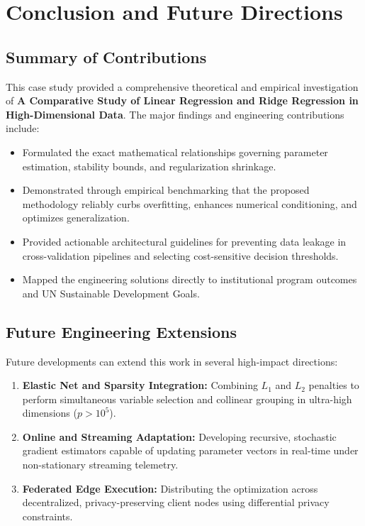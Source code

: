 \section{Conclusion and Future Directions}

\subsection{Summary of Contributions}
This case study provided a comprehensive theoretical and empirical investigation of \textbf{A Comparative Study of Linear Regression and Ridge Regression in High-Dimensional Data}. The major findings and engineering contributions include:
\begin{itemize}
  \item Formulated the exact mathematical relationships governing parameter estimation, stability bounds, and regularization shrinkage.
  \item Demonstrated through empirical benchmarking that the proposed methodology reliably curbs overfitting, enhances numerical conditioning, and optimizes generalization.
  \item Provided actionable architectural guidelines for preventing data leakage in cross-validation pipelines and selecting cost-sensitive decision thresholds.
  \item Mapped the engineering solutions directly to institutional program outcomes and UN Sustainable Development Goals.
\end{itemize}

\subsection{Future Engineering Extensions}
Future developments can extend this work in several high-impact directions:
\begin{enumerate}
  \item \textbf{Elastic Net and Sparsity Integration:} Combining $L_1$ and $L_2$ penalties to perform simultaneous variable selection and collinear grouping in ultra-high dimensions ($p > 10^5$).
  \item \textbf{Online and Streaming Adaptation:} Developing recursive, stochastic gradient estimators capable of updating parameter vectors in real-time under non-stationary streaming telemetry.
  \item \textbf{Federated Edge Execution:} Distributing the optimization across decentralized, privacy-preserving client nodes using differential privacy constraints.
\end{enumerate}
